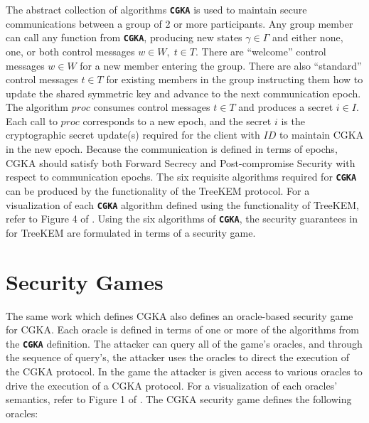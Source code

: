 The abstract collection of algorithms \textbf{\texttt{CGKA}} is used to maintain secure communications between a group of 2 or more participants.
Any group member can call any function from \textbf{\texttt{CGKA}}, producing new states \(\gamma \in \Gamma\) and either none, one, or both control messages \(w \in W,\; t \in T\).
There are ``welcome'' control messages \(w \in W\) for a new member entering the group.
There are also ``standard'' control messages \(t \in T\) for existing members in the group instructing them how to update the shared symmetric key and advance to the next communication epoch.
The algorithm \(proc\) consumes control messages \(t \in T\) and produces a secret \(i \in I\).
Each call to \(proc\) corresponds to a new epoch, and the secret \(i\) is the cryptographic secret update(s) required for the client with \(ID\) to maintain CGKA in the new epoch.
Because the communication is defined in terms of epochs, CGKA should satisfy both Forward Secrecy and Post-compromise Security with respect to communication epochs.
The six requisite algorithms required for \textbf{\texttt{CGKA}} can be produced by the functionality of the TreeKEM protocol.
For a visualization of each \textbf{\texttt{CGKA}} algorithm defined using the functionality of TreeKEM, refer to Figure 4 of \autocite{alwen2020security}.
Using the six algorithms of \textbf{\texttt{CGKA}}, the security guarantees in for TreeKEM are formulated in terms of a security game.

\hypertarget{security-games}{%
\section{Security Games}\label{security-games}}

The same work which defines CGKA also defines an oracle-based security game for CGKA.
Each oracle is defined in terms of one or more of the algorithms from the \textbf{\texttt{CGKA}} definition.
The attacker can query all of the game's oracles, and through the sequence of query's, the attacker uses the oracles to direct the execution of the CGKA protocol.
In the game the attacker is given access to various oracles to drive the execution of a CGKA protocol.
For a visualization of each oracles' semantics, refer to Figure 1 of \autocite{alwen2020security}.
The CGKA security game defines the following oracles:


